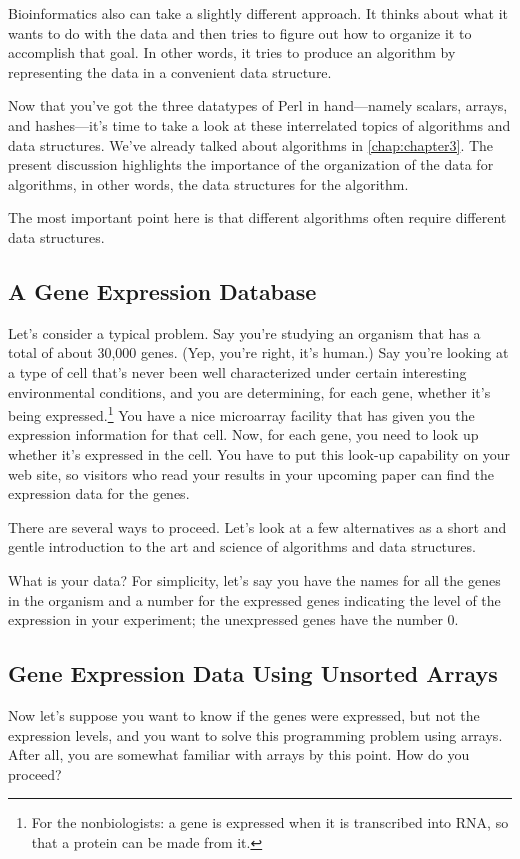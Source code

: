 Bioinformatics also can take a slightly different approach. It thinks about what it wants to do with the data and then tries to figure out how to organize it to accomplish that goal. In other words, it tries to produce an algorithm by representing the data in a convenient data structure.

Now that you've got the three datatypes of Perl in hand—namely scalars, arrays, and hashes—it's time to take a look at these interrelated topics of algorithms and data structures. We've already talked about algorithms in \autoref{chap:chapter3}. The present discussion highlights the importance of the organization of the data for algorithms, in other words, the data structures for the algorithm.

The most important point here is that different algorithms often require different data structures. 

\subsection{A Gene Expression Database}
Let's consider a typical problem. Say you're studying an organism that has a total of about 30,000 genes. (Yep, you're right, it's human.) Say you're looking at a type of cell that's never been well characterized under certain interesting environmental conditions, and you are determining, for each gene, whether it's being expressed.\footnote{For the nonbiologists: a gene is expressed when it is transcribed into RNA, so that a protein can be made from it.} You have a nice microarray facility that has given you the expression information for that cell. Now, for each gene, you need to look up whether it's expressed in the cell. You have to put this look-up capability on your web site, so visitors who read your results in your upcoming paper can find the expression data for the genes.

There are several ways to proceed. Let's look at a few alternatives as a short and gentle introduction to the art and science of algorithms and data structures. 

What is your data? For simplicity, let's say you have the names for all the genes in the organism and a number for the expressed genes indicating the level of the expression in your experiment; the unexpressed genes have the number 0.

\subsection{Gene Expression Data Using Unsorted Arrays}
Now let's suppose you want to know if the genes were expressed, but not the expression levels, and you want to solve this programming problem using arrays. After all, you are somewhat familiar with arrays by this point. How do you proceed?

